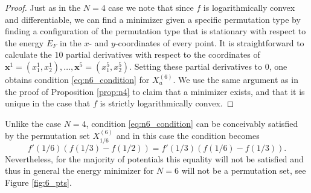 \documentclass[a4paper,12pt]{article}
\numberwithin{equation}{section}
\theoremstyle{definition}
\newcommand{\bx}{\mathbf{x}}
\begin{document}
\begin{proof}

Just as in the $N=4$ case we note that since $f$ is logarithmically convex and differentiable, we can find a minimizer given a specific permutation type by finding a configuration of the permutation type that is stationary with respect to the energy $E_F$ in the $x$- and $y$-coordinates of every point. It is straightforward to calculate the $10$ partial derivatives with respect to the coordinates of $\bx^1=(x^1_1, x^1_2), \dots, \bx^5=(x_1^5, x_2^5)$. Setting these partial derivatives to $0$, one obtains condition \eqref{eq:n6_condition} for $X_a^{(6)}$.
We use the same argument as in the proof of Proposition \ref{prop:n4} to claim that a minimizer exists, and that it is unique in the case that $f$ is strictly logarithmically convex. 
\end{proof}

Unlike  the case $N=4$,  condition \eqref{eq:n6_condition} can be conceivably satisfied by the permutation set $X^{(6)}_{1/6}$ and in this case the condition becomes $$f'(1/6)(f(1/3)-f(1/2))=f'(1/3)(f(1/6)-f(1/3)).$$
Nevertheless, for the majority of potentials this equality will not be satisfied and thus in general the energy minimizer for $N=6$ will not be a permutation set, see Figure \ref{fig:6_pts}.%
\end{document}
